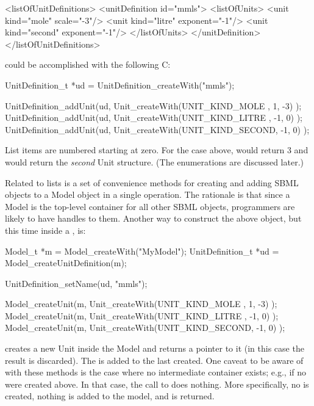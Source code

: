 \documentclass{sbmlmanual}
\begin{document}
\begin{xmlVerbatim}
  <listOfUnitDefinitions>
    <unitDefinition id="mmls">
      <listOfUnits>
        <unit kind="mole"   scale="-3"/>
        <unit kind="litre"  exponent="-1"/>
        <unit kind="second" exponent="-1"/>
      </listOfUnits>
    </unitDefinition>
  </listOfUnitDefinitions>
\end{xmlVerbatim}


could be accomplished with the following C:

\begin{cVerbatim}
  UnitDefinition_t *ud = UnitDefinition_createWith("mmls");

  UnitDefinition_addUnit(ud, Unit_createWith(UNIT_KIND_MOLE  ,  1, -3) );
  UnitDefinition_addUnit(ud, Unit_createWith(UNIT_KIND_LITRE , -1,  0) );
  UnitDefinition_addUnit(ud, Unit_createWith(UNIT_KIND_SECOND, -1,  0) );
\end{cVerbatim}

List items are numbered starting at zero.  For the case above, 
 would return 3 and
 would return the
\emph{second} Unit structure.  (The  enumerations
are discussed later.)

Related to lists is a set of convenience methods for creating and adding
SBML objects to a Model object in a single operation.  The rationale is
that since a Model is the top-level container for all other SBML objects,
programmers are likely to have handles to them.  Another way to construct
the above  object, but this time inside a
, is:


\begin{cVerbatim}
  Model_t            *m  = Model_createWith("MyModel");
  UnitDefinition_t   *ud = Model_createUnitDefinition(m);

  UnitDefinition_setName(ud, "mmls");

  Model_createUnit(m, Unit_createWith(UNIT_KIND_MOLE  ,  1, -3) );
  Model_createUnit(m, Unit_createWith(UNIT_KIND_LITRE , -1,  0) );
  Model_createUnit(m, Unit_createWith(UNIT_KIND_SECOND, -1,  0) );
\end{cVerbatim}


 creates a new Unit inside the Model
 and returns a pointer to it (in this case the result is
discarded).  The  is added to the last
 created.  One caveat to be aware of with these
methods is the case where no intermediate container exists; e.g., if no
 were created above.  In that case, the call to
 does nothing.  More specifically, no
 is created, nothing is added to the model, and 
is returned.
\end{document}
